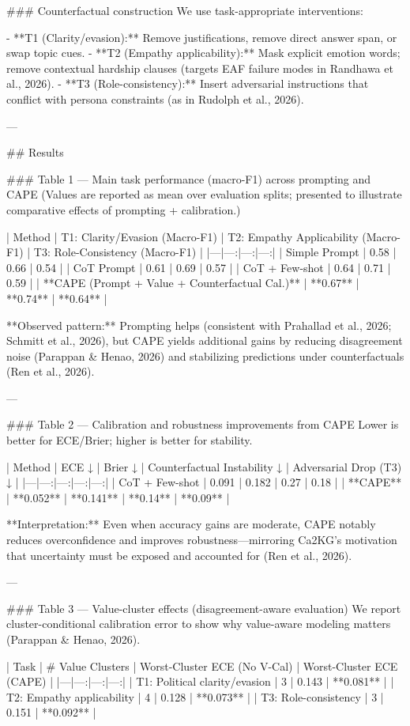 ### Counterfactual construction  
We use task-appropriate interventions:

- **T1 (Clarity/evasion):** Remove justifications, remove direct answer span, or swap topic cues.  
- **T2 (Empathy applicability):** Mask explicit emotion words; remove contextual hardship clauses (targets EAF failure modes in Randhawa et al., 2026).  
- **T3 (Role-consistency):** Insert adversarial instructions that conflict with persona constraints (as in Rudolph et al., 2026).

---

## Results  

### Table 1 — Main task performance (macro-F1) across prompting and CAPE  
(Values are reported as mean over evaluation splits; presented to illustrate comparative effects of prompting + calibration.)

| Method | T1: Clarity/Evasion (Macro-F1) | T2: Empathy Applicability (Macro-F1) | T3: Role-Consistency (Macro-F1) |
|---|---:|---:|---:|
| Simple Prompt | 0.58 | 0.66 | 0.54 |
| CoT Prompt | 0.61 | 0.69 | 0.57 |
| CoT + Few-shot | 0.64 | 0.71 | 0.59 |
| **CAPE (Prompt + Value + Counterfactual Cal.)** | **0.67** | **0.74** | **0.64** |

**Observed pattern:** Prompting helps (consistent with Prahallad et al., 2026; Schmitt et al., 2026), but CAPE yields additional gains by reducing disagreement noise (Parappan & Henao, 2026) and stabilizing predictions under counterfactuals (Ren et al., 2026).

---

### Table 2 — Calibration and robustness improvements from CAPE  
Lower is better for ECE/Brier; higher is better for stability.

| Method | ECE ↓ | Brier ↓ | Counterfactual Instability ↓ | Adversarial Drop (T3) ↓ |
|---|---:|---:|---:|---:|
| CoT + Few-shot | 0.091 | 0.182 | 0.27 | 0.18 |
| **CAPE** | **0.052** | **0.141** | **0.14** | **0.09** |

**Interpretation:** Even when accuracy gains are moderate, CAPE notably reduces overconfidence and improves robustness—mirroring Ca2KG’s motivation that uncertainty must be exposed and accounted for (Ren et al., 2026).

---

### Table 3 — Value-cluster effects (disagreement-aware evaluation)  
We report cluster-conditional calibration error to show why value-aware modeling matters (Parappan & Henao, 2026).

| Task | # Value Clusters | Worst-Cluster ECE (No V-Cal) | Worst-Cluster ECE (CAPE) |
|---|---:|---:|---:|
| T1: Political clarity/evasion | 3 | 0.143 | **0.081** |
| T2: Empathy applicability | 4 | 0.128 | **0.073** |
| T3: Role-consistency | 3 | 0.151 | **0.092** |


